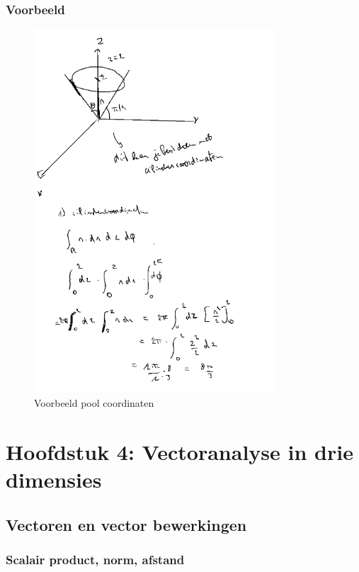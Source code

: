 \documentclass[a4paper]{article}
\begin{document}
\subsubsection{Voorbeeld}


\begin{figure}[H]
	\centering
	\includegraphics[width=0.8\textwidth]{assets/voorbeeld_pool_coordinaten.png}
	\caption{Voorbeeld pool coordinaten}
	\label{fig:voorbeeld_pool_coordinaten}
\end{figure}

\section{Hoofdstuk 4: Vectoranalyse in drie dimensies }

\subsection{Vectoren en vector bewerkingen}

\subsubsection{Scalair product, norm, afstand}
\end{document}
